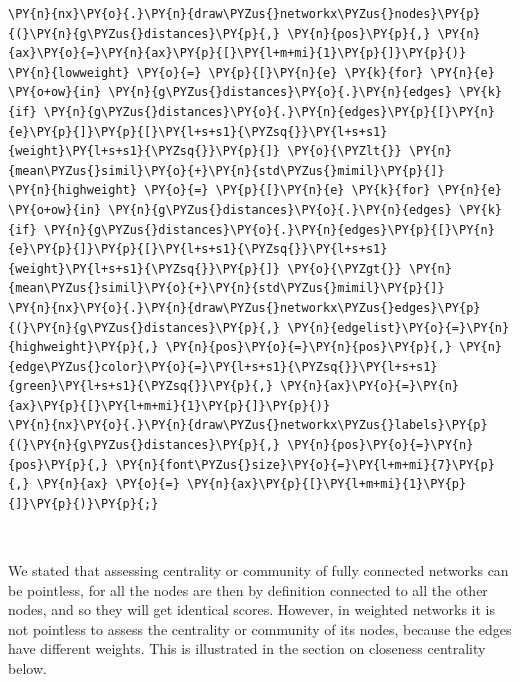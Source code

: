 \begin{tcolorbox}[breakable, size=fbox, boxrule=1pt, pad at break*=1mm,colback=cellbackground, colframe=cellborder]
\begin{Verbatim}[commandchars=\\\{\}]
\PY{n}{nx}\PY{o}{.}\PY{n}{draw\PYZus{}networkx\PYZus{}nodes}\PY{p}{(}\PY{n}{g\PYZus{}distances}\PY{p}{,} \PY{n}{pos}\PY{p}{,} \PY{n}{ax}\PY{o}{=}\PY{n}{ax}\PY{p}{[}\PY{l+m+mi}{1}\PY{p}{]}\PY{p}{)}
\PY{n}{lowweight} \PY{o}{=} \PY{p}{[}\PY{n}{e} \PY{k}{for} \PY{n}{e} \PY{o+ow}{in} \PY{n}{g\PYZus{}distances}\PY{o}{.}\PY{n}{edges} \PY{k}{if} \PY{n}{g\PYZus{}distances}\PY{o}{.}\PY{n}{edges}\PY{p}{[}\PY{n}{e}\PY{p}{]}\PY{p}{[}\PY{l+s+s1}{\PYZsq{}}\PY{l+s+s1}{weight}\PY{l+s+s1}{\PYZsq{}}\PY{p}{]} \PY{o}{\PYZlt{}} \PY{n}{mean\PYZus{}simil}\PY{o}{+}\PY{n}{std\PYZus{}mimil}\PY{p}{]}
\PY{n}{highweight} \PY{o}{=} \PY{p}{[}\PY{n}{e} \PY{k}{for} \PY{n}{e} \PY{o+ow}{in} \PY{n}{g\PYZus{}distances}\PY{o}{.}\PY{n}{edges} \PY{k}{if} \PY{n}{g\PYZus{}distances}\PY{o}{.}\PY{n}{edges}\PY{p}{[}\PY{n}{e}\PY{p}{]}\PY{p}{[}\PY{l+s+s1}{\PYZsq{}}\PY{l+s+s1}{weight}\PY{l+s+s1}{\PYZsq{}}\PY{p}{]} \PY{o}{\PYZgt{}} \PY{n}{mean\PYZus{}simil}\PY{o}{+}\PY{n}{std\PYZus{}mimil}\PY{p}{]}
\PY{n}{nx}\PY{o}{.}\PY{n}{draw\PYZus{}networkx\PYZus{}edges}\PY{p}{(}\PY{n}{g\PYZus{}distances}\PY{p}{,} \PY{n}{edgelist}\PY{o}{=}\PY{n}{highweight}\PY{p}{,} \PY{n}{pos}\PY{o}{=}\PY{n}{pos}\PY{p}{,} \PY{n}{edge\PYZus{}color}\PY{o}{=}\PY{l+s+s1}{\PYZsq{}}\PY{l+s+s1}{green}\PY{l+s+s1}{\PYZsq{}}\PY{p}{,} \PY{n}{ax}\PY{o}{=}\PY{n}{ax}\PY{p}{[}\PY{l+m+mi}{1}\PY{p}{]}\PY{p}{)}
\PY{n}{nx}\PY{o}{.}\PY{n}{draw\PYZus{}networkx\PYZus{}labels}\PY{p}{(}\PY{n}{g\PYZus{}distances}\PY{p}{,} \PY{n}{pos}\PY{o}{=}\PY{n}{pos}\PY{p}{,} \PY{n}{font\PYZus{}size}\PY{o}{=}\PY{l+m+mi}{7}\PY{p}{,} \PY{n}{ax} \PY{o}{=} \PY{n}{ax}\PY{p}{[}\PY{l+m+mi}{1}\PY{p}{]}\PY{p}{)}\PY{p}{;}
\end{Verbatim}
\end{tcolorbox}

    \begin{center}
    \end{center}
    { \hspace*{\fill} \\}
    
    We stated that assessing centrality or community of fully connected
networks can be pointless, for all the nodes are then by definition
connected to all the other nodes, and so they will get identical scores.
However, in weighted networks it is not pointless to assess the
centrality or community of its nodes, because the edges have different
weights. This is illustrated in the section on closeness centrality
below.

